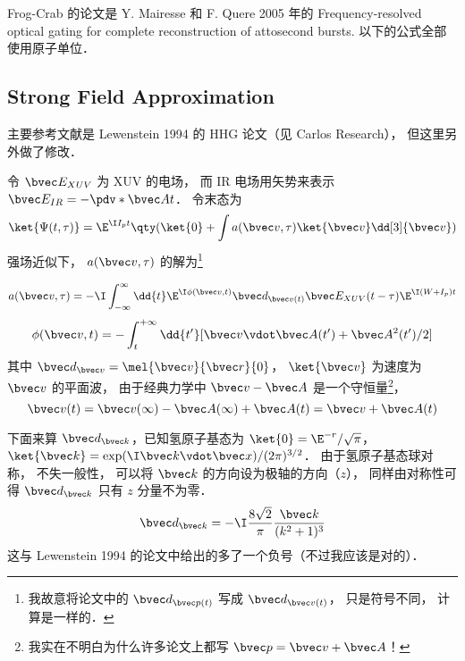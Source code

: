 
Frog-Crab 的论文是 Y. Mairesse 和 F. Quere 2005 年的 Frequency-resolved optical gating for complete reconstruction of attosecond bursts. 以下的公式全部使用原子单位．

\subsection{Strong Field Approximation}

主要参考文献是 Lewenstein 1994 的 HHG 论文（见 Carlos Research）， 但这里另外做了修改．

令 $\bvec E_{XUV}$ 为 XUV 的电场， 而 IR 电场用矢势来表示 $\bvec E_{IR} = -\pdv*{\bvec A}{t}$． 令末态为
\begin{equation}
\ket{\Psi(t, \tau)} = \E^{\I I_p t} \qty(\ket{0} + \int a(\bvec v, \tau) \ket{\bvec v} \dd[3]{\bvec v})
\end{equation}
强场近似下， $a(\bvec v, \tau)$ 的解为\footnote{我故意将论文中的 $\bvec d_{\bvec p(t)}$ 写成 $\bvec d_{\bvec v(t)}$， 只是符号不同， 计算是一样的．}

\begin{equation}
a(\bvec v, \tau) = -\I\int_{-\infty}^{\infty} \dd{t} \E^{\I\phi(\bvec v, t)} \bvec d_{\bvec v(t)} \bvec E_{XUV}(t-\tau) \E^{\I(W+I_p)t}
\end{equation}
\begin{equation}
\phi(\bvec v, t) = -\int_t^{+\infty} \dd{t'} [\bvec v\vdot \bvec A(t') + \bvec A^2(t')/2]
\end{equation}
其中 $\bvec d_{\bvec v} = \mel{\bvec v}{\bvec r}{0}$， $\ket{\bvec v}$ 为速度为 $\bvec v$ 的平面波， 由于经典力学中 $\bvec v - \bvec A$ 是一个守恒量\footnote{我实在不明白为什么许多论文上都写 $\bvec p = \bvec v + \bvec A$！}，%
\begin{equation}
\bvec v(t) = \bvec v(\infty) - \bvec A(\infty) + \bvec A(t) = \bvec v + \bvec A(t)
\end{equation}

下面来算 $\bvec d_{\bvec k}$，已知氢原子基态为 $\ket{0} = \E^{-r}/\sqrt{\pi}$， $\ket{\bvec k} = \exp(\I \bvec k \vdot \bvec x)/(2\pi)^{3/2}$． 由于氢原子基态球对称， 不失一般性， 可以将 $\bvec k$ 的方向设为极轴的方向（$z$）， 同样由对称性可得 $\bvec d_{\bvec k}$ 只有 $z$ 分量不为零．
\begin{equation}
\bvec d_{\bvec k} = -\I \frac{8\sqrt2}{\pi} \frac{\bvec k}{(k^2+1)^3}
\end{equation}
这与 Lewenstein 1994 的论文中给出的多了一个负号（不过我应该是对的）．

